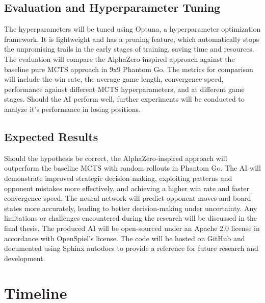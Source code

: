 \documentclass[12pt,oneside,openright]{article}
\begin{document}
\subsection{Evaluation and Hyperparameter Tuning}

The hyperparameters will be tuned using Optuna, a hyperparameter
optimization framework. It is lightweight and has a pruning feature, which
automatically stops the unpromising trails in the early stages of training,
saving time and resources.
The evaluation will compare the AlphaZero-inspired approach against the
baseline pure MCTS approach in 9x9 Phantom Go. The metrics for comparison
will include the win rate, the average game length, convergence speed,
performance against different MCTS hyperparameters, and at different game
stages. Should the AI perform well, further experiments will be conducted
to analyze it's performance in losing positions.

\subsection{Expected Results}
Should the hypothesis be correct, the AlphaZero-inspired approach will
outperform the baseline MCTS with random rollouts in Phantom Go. The AI
will demonstrate improved strategic decision-making, exploiting patterns
and opponent mistakes more effectively, and achieving a higher win rate
and faster convergence speed. The neural network will predict opponent
moves and board states more accurately, leading to better decision-making
under uncertainty.
Any limitations or challenges encountered during the research will be
discussed in the final thesis. The produced AI will be open-sourced under
an Apache 2.0 license in accordance with OpenSpiel's license. The code
will be hosted on GitHub and documented using Sphinx autodocs to provide
a reference for future research and development.

\section{Timeline}
\end{document}
